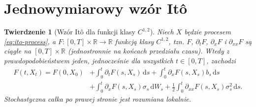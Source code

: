 \documentclass[11pt,a4paper,oneside]{report}
\numberwithin{equation}{chapter}
\theoremstyle{plain}
\newtheorem{twierdzenie}{Twierdzenie}[chapter]
\theoremstyle{definition}
\theoremstyle{remark}
\newcommand{\R}{\mathbb{R}}
\newcommand{\dd}{\mathrm{d}}
\begin{document}
\section{Jednowymiarowy wzór Itô}\label{sec:volIII:03:03}
\begin{twierdzenie}[Wzór Itô dla funkcji klasy $C^{1,2}$]\label{thm:volIII:03:01}
\label{th:ito1}
Niech $X$ będzie procesem \eqref{eq:ito-process}, a
$F:[0,T]\times\R\to\R$ funkcją klasy $C^{1,2}$,
tzn. $F$, $\partial_tF$, $\partial_xF$ i
$\partial_{xx}F$ są ciągłe na $[0,T]\times\R$
(jednostronnie na końcach przedziału czasu). Wtedy
z prawdopodobieństwem jeden, jednocześnie dla wszystkich
$t\in[0,T]$, zachodzi
\[
\begin{split}
F(t,X_t)=F(0,X_0)
&+\int_0^t\partial_tF(s,X_s)\,\dd s
+\int_0^t\partial_xF(s,X_s)b_s\,\dd s\\
&+\int_0^t\partial_xF(s,X_s)\sigma_s\,\dd W_s
+\frac12\int_0^t\partial_{xx}F(s,X_s)\sigma_s^2\,\dd s.
\end{split}
\tag{3.3}\label{eq:ito1}
\]
Stochastyczna całka po prawej stronie jest rozumiana lokalnie.
\end{twierdzenie}
\end{document}
